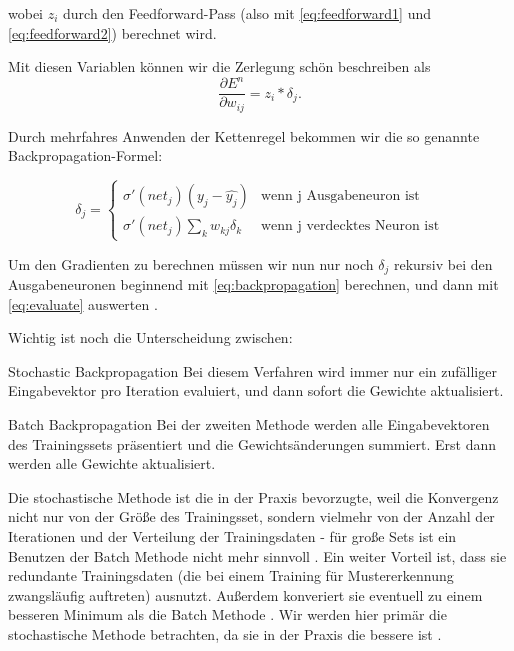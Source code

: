 wobei $z_i$ durch den Feedforward-Pass (also mit \ref{eq:feedforward1} und \ref{eq:feedforward2}) berechnet wird. 

Mit diesen Variablen können wir die Zerlegung schön beschreiben als
\begin{equation}
\label{eq:evaluate}
  \frac{\partial E^n}{\partial w_{ij}} = z_i * \delta_j.
\end{equation}

Durch mehrfahres Anwenden der Kettenregel bekommen wir die so genannte Backpropagation-Formel:

\begin{equation}
\label{eq:backpropagation}
\delta_j =  \begin{cases}
               \sigma ' (net_j) (y_j - \hat{y_j})          & \text{wenn j Ausgabeneuron ist}\\
               \sigma ' (net_j) \sum_k w_{kj} \delta_k     & \text{wenn j verdecktes Neuron ist}
           \end{cases} 
\end{equation} 


Um den Gradienten zu berechnen müssen wir nun nur noch $\delta_j$ rekursiv bei den Ausgabeneuronen beginnend mit \ref{eq:backpropagation} berechnen, und dann mit \ref{eq:evaluate} auswerten \cite{bishop1995neural}. 

Wichtig ist noch die Unterscheidung zwischen:

\begin{LaTeXdescription}
	\item[Stochastic Backpropagation]
	Bei diesem Verfahren wird immer nur ein zufälliger Eingabevektor pro Iteration evaluiert, und dann sofort die Gewichte aktualisiert. 
	\item[Batch Backpropagation] 
	Bei der zweiten Methode werden alle Eingabevektoren des Trainingssets präsentiert und die Gewichtsänderungen summiert. Erst dann werden alle Gewichte aktualisiert.\cite{duda2012pattern}
\end{LaTeXdescription}

Die stochastische Methode ist die in der Praxis bevorzugte, weil die Konvergenz nicht nur von der Größe des Trainingsset, sondern vielmehr von der Anzahl der Iterationen und der Verteilung der Trainingsdaten - für große Sets ist ein Benutzen der Batch Methode nicht mehr sinnvoll \cite{bengio2012practical}.
Ein weiter Vorteil ist, dass sie redundante Trainingsdaten (die bei einem Training für Mustererkennung zwangsläufig auftreten) ausnutzt. Außerdem konveriert sie eventuell zu einem besseren Minimum als die Batch Methode \cite{lecunefficient}.
Wir werden hier primär die stochastische Methode betrachten, da sie in der Praxis die bessere ist \cite{lecunefficient, bengio2012practical}.


